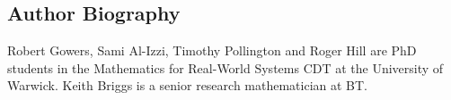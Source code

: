 \documentclass[twocolumn,secnumarabic,amssymb, nobibnotes, aps, prl,superscriptaddress]{revtex4-1}
\begin{document}
\subsection*{Author Biography}
Robert Gowers, Sami Al-Izzi, Timothy Pollington and Roger Hill are PhD students in the Mathematics for Real-World Systems CDT at the University of Warwick.  Keith Briggs is a senior research mathematician at BT.

\vspace{0.2cm}
 


\end{document}
